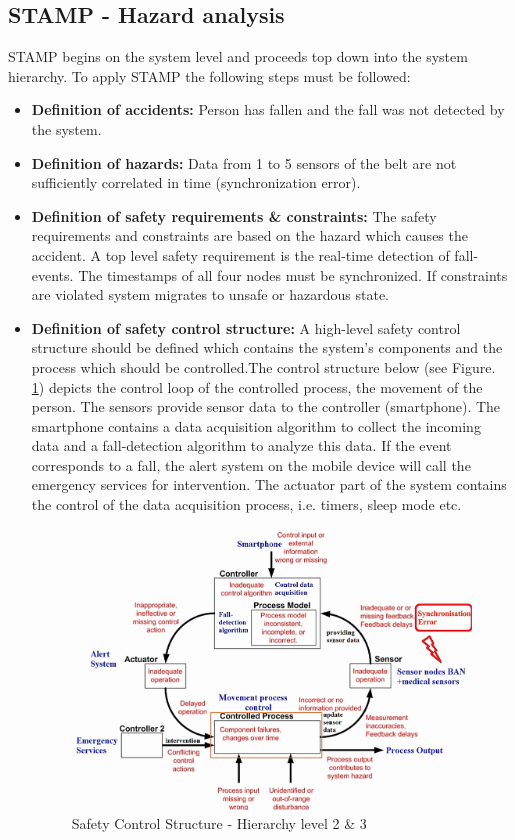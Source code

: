 \documentclass[review]{elsarticle}
\begin{document}
\subsection{STAMP - Hazard analysis}
STAMP begins on the system level and proceeds top down into the system hierarchy. To apply STAMP the following steps must be followed:
\begin{itemize}
	\item \textbf{Definition of accidents:} Person has fallen and the fall was not detected by the system.
	\item \textbf{Definition of hazards:} Data from 1 to 5 sensors of the belt are not sufficiently correlated in time (synchronization error).
	\item \textbf{Definition of safety requirements \& constraints:} The safety requirements and constraints are based on the hazard which causes the accident. A top level safety requirement is the real-time detection of fall-events. The timestamps of all four nodes must be synchronized. If constraints are violated system migrates to unsafe or hazardous state.
	\item \textbf{Definition of safety control structure:}
	A high-level safety control structure should be defined which contains the system's components and the process which should be controlled.The control structure below (see Figure. \ref{fig:STAMPLevel1}) depicts the control loop of the controlled process, the movement of the person.
	The sensors provide sensor data to the controller (smartphone). The smartphone contains a data acquisition algorithm to collect the incoming data and a fall-detection algorithm to analyze this data. If the event corresponds to a fall, the alert system on the mobile device will call the emergency services for intervention. The actuator part of the system contains the control of the data acquisition process, i.e. timers, sleep mode etc.
	\begin{figure}[!ht]
		\centering
		\includegraphics[scale=0.35]{images/STAMP-SynchError}
		\caption[Safety Control Structure - Hierarchy level 2 \& 3]{Safety Control Structure - Hierarchy level 2 \& 3}
		\label{fig:STAMPLevel1}
	\end{figure}


\end{itemize}
\end{document}
